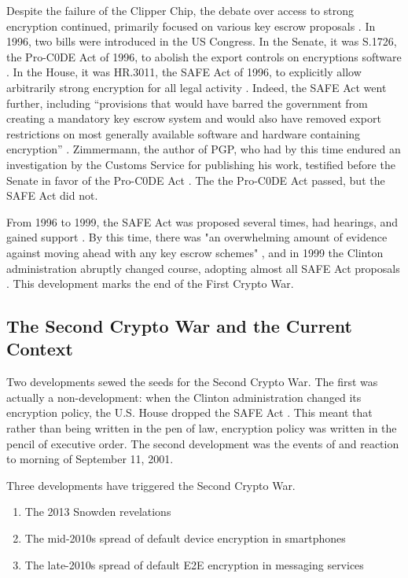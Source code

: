 Despite the failure of the Clipper Chip, the debate over access to strong encryption continued, primarily focused on
various key escrow proposals \cite{thompson_2015}. In 1996, two bills were introduced in the US Congress. In the Senate,
it was S.1726, the Pro-C0DE Act of 1996, to abolish the export controls on encryptions software \cite{burns_s1726_1996}.
In the House, it was HR.3011, the SAFE Act of 1996, to explicitly allow arbitrarily strong encryption for all legal
activity \cite{goodlatte_hr3011_1996}. Indeed, the SAFE Act went further, including ``provisions that would have
barred the government from creating a mandatory key escrow system and would also have removed export restrictions on
most generally available software and hardware containing encryption'' \cite{kehl_right_2015}. Zimmermann, the author of
PGP, who had by this time endured an investigation by the Customs Service for publishing his work, testified before the
Senate in favor of the Pro-C0DE Act \cite{zimmermann_1996}. The the Pro-C0DE Act passed, but the SAFE Act did not.

From 1996 to 1999, the SAFE Act was proposed several times, had hearings, and gained support \cite{kehl_right_2015}. By
this time, there was "an overwhelming amount of evidence against moving ahead with any key escrow schemes"
\cite{thompson_2015}, and in 1999 the Clinton administration abruptly changed course, adopting almost all SAFE Act
proposals \cite{kehl_right_2015}. This development marks the end of the First Crypto War.

\subsection{The Second Crypto War and the Current Context}

Two developments sewed the seeds for the Second Crypto War. The first was actually a non-development: when the Clinton
administration changed its encryption policy, the U.S. House dropped the SAFE Act \cite{kehl_right_2015}. This meant
that rather than being written in the pen of law, encryption policy was written in the pencil of executive order. The
second development was the events of and reaction to morning of September 11, 2001.

Three developments have triggered the Second Crypto War.
\begin{enumerate}
    \item The 2013 Snowden revelations
    \item The mid-2010s spread of default device encryption in smartphones
    \item The late-2010s spread of default E2E encryption in messaging services
\end{enumerate}

